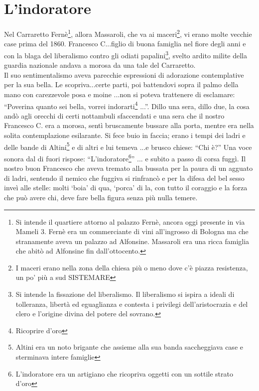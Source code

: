 \documentclass[10pt]{memoir} %
\begin{document}
\chapter{L'indoratore}
Nel Carraretto Fernè\footnote{Si intende il quartiere attorno al palazzo Fernè, ancora oggi presente in via Mameli 3. Fernè era un commerciante di vini all'ingrosso di Bologna ma che stranamente aveva un palazzo ad Alfonsine. Massaroli era una ricca famiglia che abitò ad Alfonsine fin dall'ottocento.}, allora Massaroli, che va ai maceri\footnote{I maceri erano nella zona della chiesa più o meno dove c'è piazza resistenza, un po' più a sud SISTEMARE}, vi erano molte vecchie case prima del 1860. Francesco C...figlio di buona famiglia nel fiore degli anni e con la blaga del liberalismo contro gli odiati papalini\footnote{Si intende la fissazione del liberalismo. Il liberalismo si ispira a ideali di tolleranza, libertà ed eguaglianza e contesta i privilegi dell'aristocrazia e del clero e l'origine divina del potere del sovrano.}, svelto ardito milite della guardia nazionale andava a morosa da una tale del Carraretto. \\
Il suo sentimentalismo aveva parecchie espressioni di adorazione contemplative per la sua bella.
Le scopriva...certe parti, poi battendovi sopra il palmo della mano con carezzevole posa e moine ...non si poteva trattenere di esclamare: “Poverina quanto sei bella, vorrei indorarti\footnote{Ricoprire d'oro} ...”.
Dillo una sera, dillo due, la cosa andò agli orecchi di certi nottambuli sfaccendati e una sera che il nostro Francesco C. era a morosa, sentì bruscamente bussare alla porta, mentre era nella solita contemplazione esilarante.
Si fece buio in faccia; erano i tempi dei ladri e delle bande di Altini\footnote{Altini era un noto brigante che assieme alla sua banda saccheggiava case e sterminava intere famiglie} e di altri e lui temeva ...e brusco chiese: “Chi è?”
Una voce sonora dal di fuori rispose: “L’indoratore\footnote{L'indoratore era un artigiano che ricopriva oggetti con un sottile strato d'oro}” ... e subito a passo di corsa fuggì.
Il nostro buon Francesco che aveva tremato alla bussata per la paura di un agguato di ladri, sentendo il nemico che fuggiva si rinfrancò e per la difesa del bel sesso inveì alle stelle: molti ‘boia’ di qua, ‘porca’ di la, con tutto il coraggio e la forza che può avere chi, deve fare bella figura senza più nulla temere. 
\end{document}

